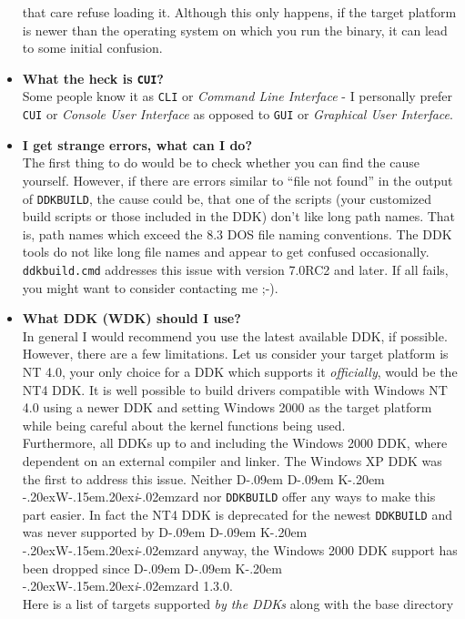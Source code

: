\documentclass[a4paper,titlepage]{report}
\def\ddkwiz{\texorpdfstring{D\kern-.09em D\kern-.09em K\kern-.20em \raise-.20ex\hbox{W}\kern-.15em\raise.20ex\hbox{\it{i}}\kern-.02em{zard}}{DDKWizard}}
\begin{document}
\begin{itemize}
        that care refuse loading it. Although this only happens, if the target platform
        is newer than the operating system on which you run the binary, it can lead
        to some initial confusion.
  \item \textbf{What the heck is \texttt{CUI}?}\\
        Some people know it as \texttt{CLI} or \emph{Command Line Interface} - I
        personally prefer \texttt{CUI} or \emph{Console User Interface} as opposed
        to \texttt{GUI} or \emph{Graphical User Interface}.
  \item \textbf{I get strange errors, what can I do?}\\
        The first thing to do would be to check whether you can find the cause yourself.
        However, if there are errors similar to ``file not found'' in the output of
        \texttt{DDKBUILD}, the cause could be, that one of the scripts (your customized
        build scripts or those included in the DDK) don't like long path names. That is,
        path names which exceed the 8.3 DOS file naming conventions. The DDK tools do not
        like long file names and appear to get confused occasionally. \texttt{ddkbuild.cmd}
        addresses this issue with version 7.0RC2 and later. If all fails, you might want to
        consider contacting me \textsf{;-)}.
  \item \textbf{What DDK (WDK) should I use?}\\
        In general I would recommend you use the latest available DDK, if possible. However,
        there are a few limitations. Let us consider your target platform is NT 4.0, your
        only choice for a DDK which supports it \emph{officially}, would be the NT4 DDK.
        It is well possible to build drivers compatible with Windows NT 4.0 using a newer
        DDK and setting Windows 2000 as the target platform while being careful about
        the kernel functions being used.\\
        Furthermore, all DDKs up to and including the Windows 2000 DDK, where dependent
        on an external compiler and linker. The Windows XP DDK was the first to address
        this issue. Neither \ddkwiz{} nor \texttt{DDKBUILD} offer any ways to make this
        part easier.
        In fact the NT4 DDK is deprecated for the newest \texttt{DDKBUILD} and was never
        supported by \ddkwiz{} anyway, the Windows 2000 DDK support has been dropped
        since \ddkwiz{} 1.3.0.\\
        Here is a list of targets supported \emph{by the DDKs} along with the base directory

\end{itemize}
\end{document}
